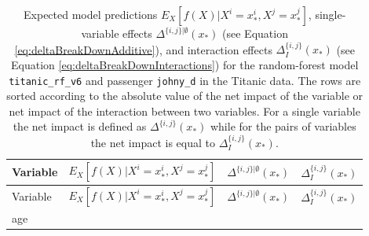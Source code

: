 \documentclass[]{krantz}
\begin{document}
\begin{longtable}[]{@{}lrrr@{}}
\caption{\label{tab:titanicIBreakDownList} Expected model predictions \(E_X[f(X)|X^i = x_*^i, X^j = x_*^j]\), single-variable effects \(\Delta^{\{i,j\}|\emptyset}(x_*)\) (see Equation \eqref{eq:deltaBreakDownAdditive}), and interaction effects \(\Delta_{I}^{\{i,j\}}(x_*)\) (see Equation \eqref{eq:deltaBreakDownInteractions}) for the random-forest model \texttt{titanic\_rf\_v6} and passenger \texttt{johny\_d} in the Titanic data. The rows are sorted according to the absolute value of the net impact of the variable or net impact of the interaction between two variables. For a single variable the net impact is defined as \(\Delta^{\{i,j\}}(x_*)\) while for the pairs of variables the net impact is equal to \(\Delta_{I}^{\{i,j\}}(x_*)\).}\tabularnewline
\toprule
\begin{minipage}[b]{0.36\columnwidth}\raggedright
Variable\strut
\end{minipage} & \begin{minipage}[b]{0.14\columnwidth}\raggedleft
\(E_X[f(X)|X^{i}= x_*^{i},X^{j}= x_*^{j}]\)\strut
\end{minipage} & \begin{minipage}[b]{0.16\columnwidth}\raggedleft
\(\Delta^{\{i,j\}|\emptyset}(x_*)\)\strut
\end{minipage} & \begin{minipage}[b]{0.23\columnwidth}\raggedleft
\(\Delta_{I}^{\{i,j\}}(x_*)\)\strut
\end{minipage}\tabularnewline
\midrule
\endfirsthead
\toprule
\begin{minipage}[b]{0.36\columnwidth}\raggedright
Variable\strut
\end{minipage} & \begin{minipage}[b]{0.14\columnwidth}\raggedleft
\(E_X[f(X)|X^{i}= x_*^{i},X^{j}= x_*^{j}]\)\strut
\end{minipage} & \begin{minipage}[b]{0.16\columnwidth}\raggedleft
\(\Delta^{\{i,j\}|\emptyset}(x_*)\)\strut
\end{minipage} & \begin{minipage}[b]{0.23\columnwidth}\raggedleft
\(\Delta_{I}^{\{i,j\}}(x_*)\)\strut
\end{minipage}\tabularnewline
\midrule
\endhead
\begin{minipage}[t]{0.36\columnwidth}\raggedright
age\strut
\end{minipage} & \begin{minipage}[t]{0.14\columnwidth}\raggedleft

\end{minipage}
\end{longtable}
\end{document}
